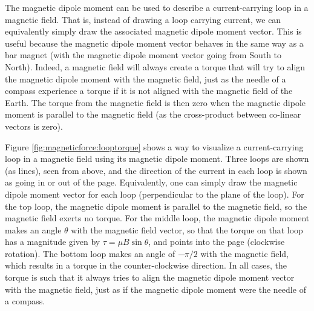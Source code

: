 The magnetic dipole moment can be used to describe a current-carrying loop in a magnetic field. That is, instead of drawing a loop carrying current, we can equivalently simply draw the associated magnetic dipole moment vector. This is useful because the magnetic dipole moment vector behaves in the same way as a bar magnet (with the magnetic dipole moment vector going from South to North). Indeed, a magnetic field will always create a torque that will try to align the magnetic dipole moment with the magnetic field, just as the needle of a compass experience a torque if it is not aligned with the magnetic field of the Earth. The torque from the magnetic field is then zero when the magnetic dipole moment is parallel to the magnetic field (as the cross-product between co-linear vectors is zero). 

Figure \ref{fig:magneticforce:looptorque} shows a way to visualize a current-carrying loop in a magnetic field using its magnetic dipole moment.  
Three loops are shown (as lines), seen from above, and the direction of the current in each loop is shown as going in or out of the page. Equivalently, one can simply draw the magnetic dipole moment vector for each loop (perpendicular to the plane of the loop). For the top loop, the magnetic dipole moment is parallel to the magnetic field, so the magnetic field exerts no torque. For the middle loop, the magnetic dipole moment makes an angle $\theta$ with the magnetic field vector, so that the torque on that loop has a magnitude given by $\tau=\mu B \sin\theta$, and points into the page (clockwise rotation). The bottom loop makes an angle of $-\pi/2$ with the magnetic field, which results in a torque in the counter-clockwise direction. In all cases, the torque is such that it always tries to align the magnetic dipole moment vector with the magnetic field, just as if the magnetic dipole moment were the needle of a compass. 

